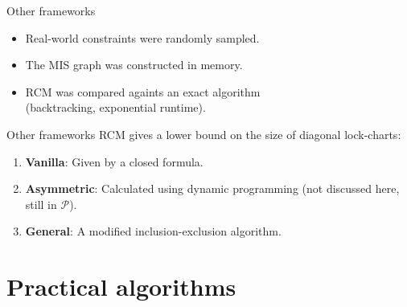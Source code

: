 \begin{frame}{Other frameworks}
  \begin{minipage}[t][180pt][t]{.44\textwidth}
    \begin{itemize}
      \item Real-world constraints were randomly sampled.
      \item The MIS graph was constructed in memory.
      \item RCM was compared againts an exact algorithm\\
        (backtracking, exponential runtime).
    \end{itemize}
  \end{minipage}
  \hfill
  \begin{minipage}[t][180pt][t]{.45\textwidth}
    \bigskip

    \resizebox{1.1\textwidth}{1.1\textwidth}{%
      
    }
  \end{minipage}
\end{frame}

\begin{frame}{Other frameworks}
  RCM gives a lower bound on the size of diagonal lock-charts:
  \begin{enumerate}
    \item \textbf{Vanilla}: Given by a closed formula.
    \item \textbf{Asymmetric}: Calculated using
      dynamic programming (not discussed here, still in $\mathcal{P}$).
    \item \textbf{General}: A modified inclusion-exclusion algorithm.
  \end{enumerate}
\end{frame}




\section{Practical algorithms}
\sectionframe



